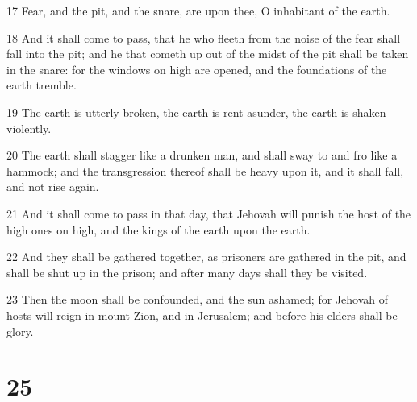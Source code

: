 \par 17 Fear, and the pit, and the snare, are upon thee, O inhabitant of the earth.
\par 18 And it shall come to pass, that he who fleeth from the noise of the fear shall fall into the pit; and he that cometh up out of the midst of the pit shall be taken in the snare: for the windows on high are opened, and the foundations of the earth tremble.
\par 19 The earth is utterly broken, the earth is rent asunder, the earth is shaken violently.
\par 20 The earth shall stagger like a drunken man, and shall sway to and fro like a hammock; and the transgression thereof shall be heavy upon it, and it shall fall, and not rise again.
\par 21 And it shall come to pass in that day, that Jehovah will punish the host of the high ones on high, and the kings of the earth upon the earth.
\par 22 And they shall be gathered together, as prisoners are gathered in the pit, and shall be shut up in the prison; and after many days shall they be visited.
\par 23 Then the moon shall be confounded, and the sun ashamed; for Jehovah of hosts will reign in mount Zion, and in Jerusalem; and before his elders shall be glory.

\chapter{25}

